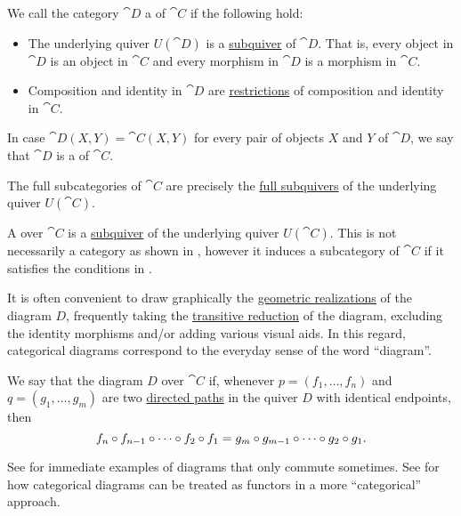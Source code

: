 \begin{definition}\label{def:subcategory}
  We call the category \( \cat{D} \) a  of \( \cat{C} \) if the following hold:
  \begin{itemize}
    \item The underlying quiver \( U(\cat{D}) \) is a \hyperref[eq:def:hypergraph/submodel]{subquiver} of \( \cat{D} \). That is, every object in \( \cat{D} \) is an object in \( \cat{C} \) and every morphism in \( \cat{D} \) is a morphism in \( \cat{C} \).
    \item Composition and identity in \( \cat{D} \) are \hyperref[def:multi_valued_function/restriction]{restrictions} of composition and identity in \( \cat{C} \).
  \end{itemize}

  In case \( \cat{D}(X, Y) = \cat{C}(X, Y) \) for every pair of objects \( X \) and \( Y \) of \( \cat{D} \), we say that \( \cat{D} \) is a  of \( \cat{C} \).

  The full subcategories of \( \cat{C} \) are precisely the \hyperref[eq:def:hypergraph/submodel/full]{full subquivers} of the underlying quiver \( U(\cat{C}) \).
\end{definition}

\begin{definition}\label{def:categorical_diagram}
  A  over \( \cat{C} \) is a \hyperref[eq:def:hypergraph/submodel/full]{subquiver} of the underlying quiver \( U(\cat{C}) \). This is not necessarily a category as shown in , however it induces a subcategory of \( \cat{C} \) if it satisfies the conditions in .

  It is often convenient to draw graphically the \hyperref[def:quiver_geometric_realization]{geometric realizations} of the diagram \( D \), frequently taking the \hyperref[def:quiver_transitive_closure]{transitive reduction} of the diagram, excluding the identity morphisms and/or adding various visual aids. In this regard, categorical diagrams correspond to the everyday sense of the word \enquote{diagram}.

  We say that the diagram \( D \) over \( \cat{C} \)  if, whenever \( p = (f_1, \ldots, f_n) \) and \( q = (g_1, \ldots, g_m) \) are two \hyperref[def:quiver_path/directed]{directed paths} in the quiver \( D \) with identical endpoints, then
  \begin{equation*}
    f_n \bincirc f_{n-1} \bincirc \cdots \bincirc f_2 \bincirc f_1
    =
    g_m \bincirc g_{m-1} \bincirc \cdots \bincirc g_2 \bincirc g_1.
  \end{equation*}

  See  for immediate examples of diagrams that only commute sometimes. See  for how categorical diagrams can be treated as functors in a more \enquote{categorical} approach.
\end{definition}

